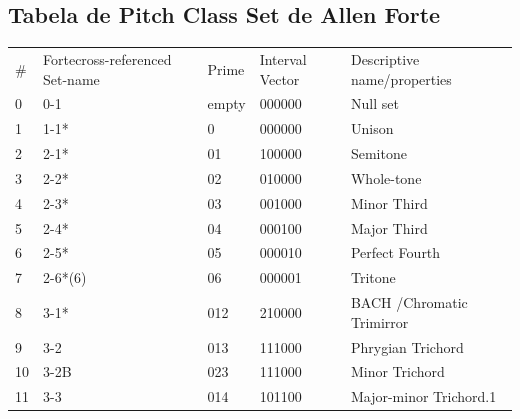 \documentclass[
	12pt,				%
	openright,			%
	twoside,			%
	a4paper,			%
	english,			%
	french,				%
	spanish,			%
	brazil				%
	]{abntex2}
\begin{document}
\begin{anexosenv}

\partanexos

\chapter{Tabela de Pitch Class Set de Allen Forte}
\label{forte}

\begin{table}[h]
\begin{tabular}{lllll}
\# & Fortecross-referenced Set-name & Prime & Interval Vector & Descriptive name/properties                       \\
0  & 0-1                            & empty & 000000          & Null set                                          \\
1  & 1-1*                           & 0     & 000000          & Unison                                            \\
2  & 2-1*                           & 01    & 100000          & Semitone                                          \\
3  & 2-2*                           & 02    & 010000          & Whole-tone                                        \\
4  & 2-3*                           & 03    & 001000          & Minor Third                                       \\
5  & 2-4*                           & 04    & 000100          & Major Third                                       \\
6  & 2-5*                           & 05    & 000010          & Perfect Fourth                                    \\
7  & 2-6*(6)                        & 06    & 000001          & Tritone                                           \\
8  & 3-1*                           & 012   & 210000          & BACH /Chromatic Trimirror                         \\
9  & 3-2                            & 013   & 111000          & Phrygian Trichord                                 \\
10 & 3-2B                           & 023   & 111000          & Minor Trichord                                    \\
11 & 3-3                            & 014   & 101100          & Major-minor Trichord.1                            \\

\end{tabular}
\end{table}
\end{anexosenv}
\end{document}
